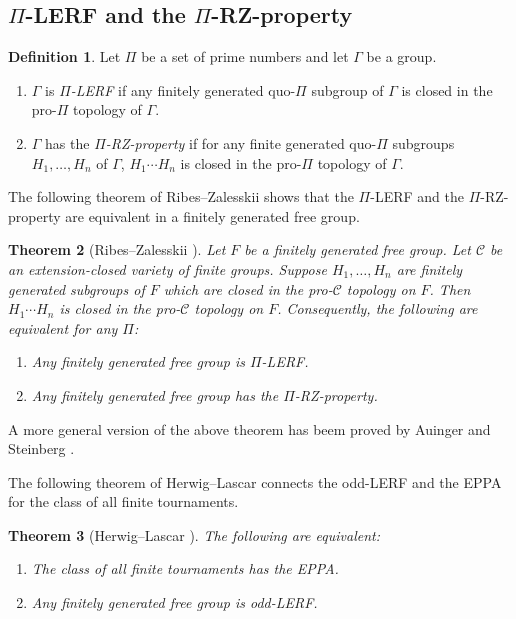 \documentclass[10pt,a4paper]{amsart}
\newtheorem{theorem}{Theorem}[section]
\theoremstyle{definition}
\newtheorem{definition}[theorem]{Definition}
\theoremstyle{definition}
\numberwithin{equation}{section}
\begin{document}
\subsection{$\Pi$-LERF and the $\Pi$-RZ-property}

\begin{definition} Let $\Pi$ be a set of prime numbers and let $\Gamma$ be a group.
\begin{enumerate}
\item[(i)] $\Gamma$ is {\em $\Pi$-LERF} if any finitely generated quo-$\Pi$ subgroup of $\Gamma$ is closed in the pro-$\Pi$ topology of $\Gamma$.
\item[(ii)] $\Gamma$ has the {\em $\Pi$-RZ-property} if for any finite generated quo-$\Pi$ subgroups $H_1, \dots, H_n$ of $\Gamma$, $H_1\cdots H_n$ is closed in the pro-$\Pi$ topology of $\Gamma$.
\end{enumerate}
\end{definition}



The following theorem of Ribes--Zalesskii shows that the $\Pi$-LERF and the $\Pi$-RZ-property are equivalent in a finitely generated free group.

\begin{theorem}[Ribes--Zalesskii {\cite[Theorem 5.1]{RZ94}}] Let $F$ be a finitely generated free group. Let $\mathcal{C}$ be an extension-closed variety of finite groups. Suppose $H_1, \dots, H_n$ are finitely generated subgroups of $F$ which are closed in the pro-$\mathcal{C}$ topology on $F$. Then $H_1\cdots H_n$ is closed in the pro-$\mathcal{C}$ topology on $F$. Consequently, the following are equivalent for any $\Pi$:
\begin{enumerate}
\item[(a)] Any finitely generated free group is $\Pi$-LERF.
\item[(b)] Any finitely generated free group has the $\Pi$-RZ-property.
\end{enumerate}
\end{theorem}

A more general version of the above theorem has beem proved by Auinger and Steinberg \cite[Theorem 3.5]{AS05}.

The following theorem of Herwig--Lascar connects the odd-LERF and the EPPA for the class of all finite tournaments.

\begin{theorem}[Herwig--Lascar \cite{HL00}]\label{thm:HL} The following are equivalent:
\begin{enumerate}
\item[(a)] The class of all finite tournaments has the EPPA.
\item[(b)] Any finitely generated free group is odd-LERF.
\end{enumerate}
\end{theorem}
\end{document}
